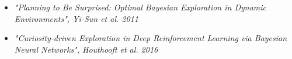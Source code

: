 \documentclass[final]{beamer}
\newlength{\onecolwid}
\begin{document}
\begin{frame}[t]
\begin{columns}[t]
\begin{column}{\onecolwid}

\begin{footnotesize}
\begin{itemize}
\item \textit{"Planning to Be Surprised: Optimal Bayesian Exploration in Dynamic Environments", Yi-Sun et al. 2011}
\item \textit{"Curiosity-driven Exploration in Deep Reinforcement Learning via Bayesian
Neural Networks", Houthooft et al. 2016}
\end{itemize}

\end{footnotesize}

\end{column} %

\end{columns} %

\end{frame} %
\end{document}
